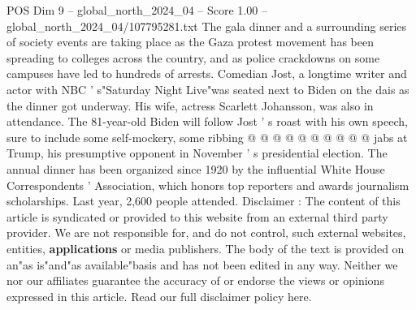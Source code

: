 \begin{textsample}{POS Dim 9 – global\_north\_2024\_04 – Score 1.00 – global\_north\_2024\_04/107795281.txt}
The gala dinner and a surrounding series of society events are taking place as the Gaza protest movement has been spreading to colleges across the country, and as police crackdowns on some campuses have led to hundreds of arrests.
Comedian Jost, a longtime writer and actor with NBC ' s"Saturday Night Live"was seated next to Biden on the dais as the dinner got underway.
His wife, actress Scarlett Johansson, was also in attendance.
The 81-year-old Biden will follow Jost ' s roast with his own speech, sure to include some self-mockery, some ribbing @ @ @ @ @ @ @ @ @ @ jabs at Trump, his presumptive opponent in November ' s presidential election.
The annual dinner has been organized since 1920 by the influential White House Correspondents ' Association, which honors top reporters and awards journalism scholarships.
Last year, 2,600 people attended.
Disclaimer : The content of this article is syndicated or provided to this website from an external third party provider.
We are not responsible for, and do not control, such external websites, entities, \textbf{applications} or media publishers.
The body of the text is provided on an"as is"and"as available"basis and has not been edited in any way.
Neither we nor our affiliates guarantee the accuracy of or endorse the views or opinions expressed in this article.
Read our full disclaimer policy here.

\end{textsample}
